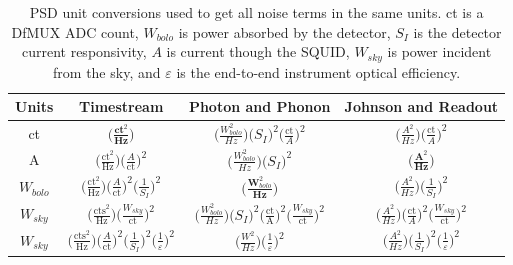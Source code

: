 \begin{table}[htp]
\begin{center}
\begin{tabular}{|c|c|c|c|}
\hline Units & Timestream & Photon and Phonon & Johnson and Readout \\ 
\hline ct & $\big( \frac{\textbf{ct}^2}{\textbf{Hz}} \big)$ & $\big( \frac{W_{bolo}^2}{Hz} \big)   \big( S_I \big) ^2 \big( \frac{\text{ct}}{A} \big) ^2$ & $\big( \frac{A^2}{Hz} \big) \big( \frac{\text{ct}}{A} \big) ^2 $ \\ 
\hline A & $\big( \frac{\text{ct}^2}{\text{Hz}} \big) \big( \frac{A}{\text{ct}} \big) ^2 $ & $\big( \frac{W_{bolo}^2}{Hz} \big) \big( S_I \big) ^2$ & $\big( \frac{\textbf{A}^2}{\textbf{Hz}} \big)$ \\ 
\hline $W_{bolo}$ & $\big( \frac{\text{ct}^2}{\text{Hz}} \big) \big( \frac{A}{\text{ct}} \big) ^2 \big( \frac{1}{S_I} \big) ^2$ & $\big( \frac{\textbf{W}_{bolo}^2}{\textbf{Hz}} \big)$ & $\big( \frac{A^2}{Hz} \big) \big( \frac{1}{S_I} \big) ^2$ \\ 
\hline $W_{sky}$ &  $\big( \frac{\text{cts}^2}{\text{Hz}} \big) \big( \frac{W_{sky}}{\text{ct}} \big) ^2$ & $\big( \frac{W_{bolo}^2}{Hz} \big) \big( S_I \big) ^2 \big( \frac{\text{ct}}{\text{A}} \big) ^2 \big( \frac{W_{sky}}{\text{ct}} \big) ^2$ & $\big( \frac{A^2}{Hz} \big) \big( \frac{\text{ct}}{A} \big) ^2 \big( \frac{W_{sky}}{\text{ct}} \big) ^2$ \\ 
\hline $W_{sky}$ & $\big( \frac{\text{cts}^2}{\text{Hz}} \big) \big( \frac{A}{\text{ct}} \big) ^2 \big( \frac{1}{S_I} \big) ^2 \big( \frac{1}{\varepsilon} \big) ^2$ & $\big( \frac{W^2}{Hz} \big)  \big( \frac{1}{\varepsilon} \big) ^2$ &  $\big( \frac{A^2}{Hz} \big) \big( \frac{1}{S_I} \big) ^2 \big( \frac{1}{\varepsilon} \big) ^2 $ \\
\hline
\end{tabular}
\end{center}
\caption[Unit conversions for noise equivalent power]{\ac{PSD} unit conversions used to get all noise terms in the same units. ct is a \ac{DfMUX} \ac{ADC} count, $W_{bolo}$ is power absorbed by the detector, $S_{I}$ is the detector current responsivity, $A$ is current though the \ac{SQUID}, $W_{sky}$ is power incident from the sky, and $\varepsilon$ is the end-to-end instrument optical efficiency. %
}
\label{psd_table}
\end{table}


